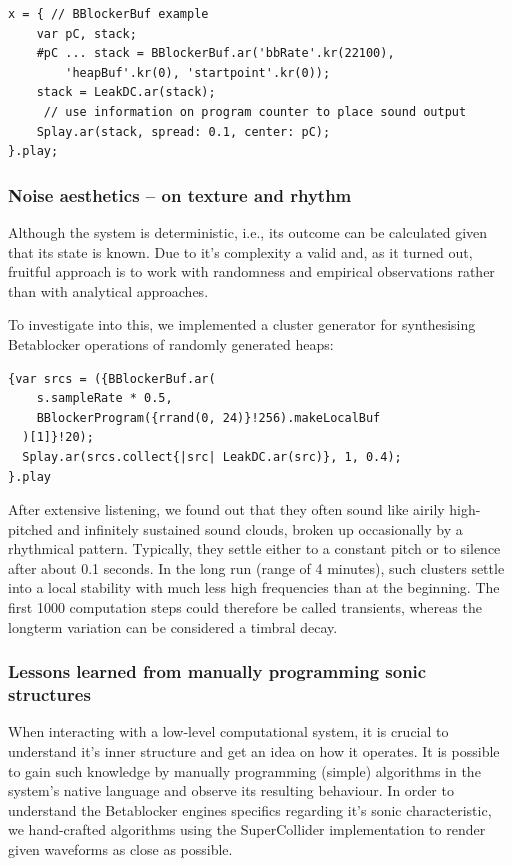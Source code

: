 \documentclass[letterpaper, 12pt]{article}
\begin{document}
\begin{Verbatim}[fontfamily=courier, xleftmargin=\parindent]
x = { // BBlockerBuf example
	var pC, stack;
	#pC ... stack = BBlockerBuf.ar('bbRate'.kr(22100), 
		'heapBuf'.kr(0), 'startpoint'.kr(0));
	stack = LeakDC.ar(stack);
	 // use information on program counter to place sound output
	Splay.ar(stack, spread: 0.1, center: pC);
}.play;
\end{Verbatim}
\parskip 18pt

\subsubsection{Noise aesthetics -- on texture and rhythm} 
\label{sub:noise_aesthetics}

Although the system is deterministic, i.e., its outcome can be calculated given that its state is known.
Due to it's complexity a valid and, as it turned out, fruitful approach is to work with randomness and empirical observations rather than with analytical approaches.

To investigate into this, we implemented a cluster generator for synthesising Betablocker operations of randomly generated heaps:
\begin{Verbatim}[fontfamily=courier, xleftmargin=\parindent]
{var srcs = ({BBlockerBuf.ar(
    s.sampleRate * 0.5, 
    BBlockerProgram({rrand(0, 24)}!256).makeLocalBuf
  )[1]}!20);
  Splay.ar(srcs.collect{|src| LeakDC.ar(src)}, 1, 0.4);
}.play
\end{Verbatim}
After extensive listening, we found out that they often sound like airily high-pitched and infinitely sustained sound clouds, broken up occasionally by a rhythmical pattern. 
Typically, they settle either to a constant pitch or to silence after about 0.1 seconds.
In the long run (range of 4 minutes), such clusters settle into a local stability with much less high frequencies than at the beginning. 
The first 1000 computation steps could therefore be called transients, whereas the longterm variation can be considered a timbral decay.
\parskip 18pt

\subsubsection{Lessons learned from manually programming sonic structures}
\label{sub:manual_programming_sonic_structures}

When interacting with a low-level computational system, it is crucial to  understand it's inner structure and get an idea on how it operates.
It is possible to gain such knowledge by manually programming (simple) algorithms in the system's native language and observe its resulting behaviour.
In order to understand the Betablocker engines specifics regarding it's sonic characteristic, we hand-crafted algorithms using the SuperCollider implementation to render given waveforms as close as possible.
\end{document}
